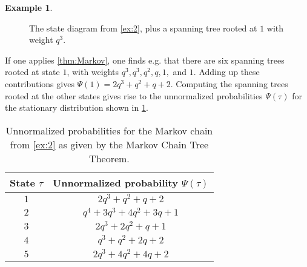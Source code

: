 \documentclass[11pt]{amsart}
\theoremstyle{definition}
\newtheorem{example}[theorem]{Example}
\theoremstyle{remark}
\begin{document}
\begin{example}
\begin{figure}[h]
{
}
\caption{The state diagram
 from \cref{ex:2}, plus a spanning tree rooted at $1$ with weight $q^3$.}
 \label{fig:10}
\end{figure}

If one applies \cref{thm:Markov}, one finds e.g. that there are 
six spanning trees rooted at state $1$, with weights
$q^3, q^3, q^2, q, 1,$ and $1$.  Adding up these contributions gives 
$\Psi(1) = 2q^3+q^2+q+2$.  Computing the spanning trees
rooted at the other states gives rise to the
unnormalized probabilities $\Psi(\tau)$ for the
stationary distribution shown in \cref{table:4}.
\begin{table}[h]
\begin{center}
\begin{tabular}{|c c| }
    \hline
	State $\tau$ & Unnormalized probability $\Psi(\tau)$\\
    \hline 
	$1$ & $2q^3+q^2+q+2$\\
	$2$ & $q^4+3q^3+4q^2+3q+1$\\
	$3$  & $2q^3+2q^2+q+1$\\
	$4$  & $q^3+q^2+2q+2$\\
	$5$ & $2q^3+4q^2+4q+2$\\
    \hline
    \end{tabular}
\end{center}
	\caption{Unnormalized probabilities for the Markov
	chain from \cref{ex:2} as given by the Markov Chain Tree Theorem.}
	\label{table:4}
\end{table}


\end{example}
\end{document}
